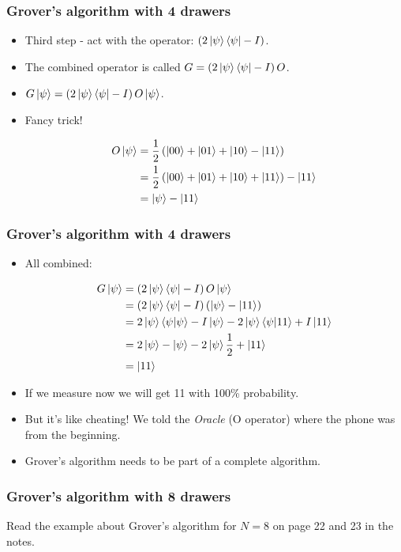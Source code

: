 \documentclass[10pt]{beamer}
\begin{document}
  \begin{frame}
    \frametitle{Grover's algorithm with 4 drawers}
    \begin{itemize}
    \item <1-> Third step - act with the operator: $\left( 2 \ket{\psi}\bra{\psi}- I \right)$.
      
    \item<2-> The combined operator is called $G = \left( 2 \ket{\psi}\bra{\psi}-I \right) O$.
    \item<3-> $G\ket{\psi}=\left( 2 \ket{\psi}\bra{\psi}-I \right) O\ket{\psi}$.
      
    \item<4-> Fancy trick!
      
\begin{align*}
  O \ket{\psi} &= \frac{1}{2}\left( \ket{00}+\ket{01}+\ket{10}-\ket{11} \right) \\
               &=\frac{1}{2}\left( \ket{00}+\ket{01}+\ket{10}+\ket{11} \right) - \ket{11} \\
  &= \ket{\psi} - \ket{11}
\end{align*}
      
    \end{itemize}
  \end{frame}
  \begin{frame}
    \frametitle{Grover's algorithm with 4 drawers}
    \begin{itemize}
    \item<1-> All combined:
      
\begin{align*}
  G\ket{\psi}&=\left( 2 \ket{\psi}\bra{\psi}-I \right) O\ket{\psi} \\
             &=\left( 2 \ket{\psi}\bra{\psi}-I \right) \left( \ket{\psi} - \ket{11} \right) \\
             &=2 \ket{\psi}\braket{\psi|\psi} - I \ket{\psi} - 2 \ket{\psi}\braket{\psi|11} + I \ket{11} \\
             &=2 \ket{\psi} - \ket{\psi} - 2 \ket{\psi}\frac{1}{2} + \ket{11} \\
  &= \ket{11}
\end{align*}
\item<2-> If we measure now we will get 11 with 100\% probability.
\item<3-|alert@3> But it's like cheating! We told the \emph{Oracle} (O operator) where the phone was from the beginning.
\item<4-|alert@4> Grover's algorithm needs to be part of a complete algorithm.
    \end{itemize}
  \end{frame}
  \begin{frame}
    \frametitle{Grover's algorithm with 8 drawers}
    Read the example about Grover's algorithm for $N=8$ on page 22 and 23 in the notes.
  \end{frame}
\end{document}
